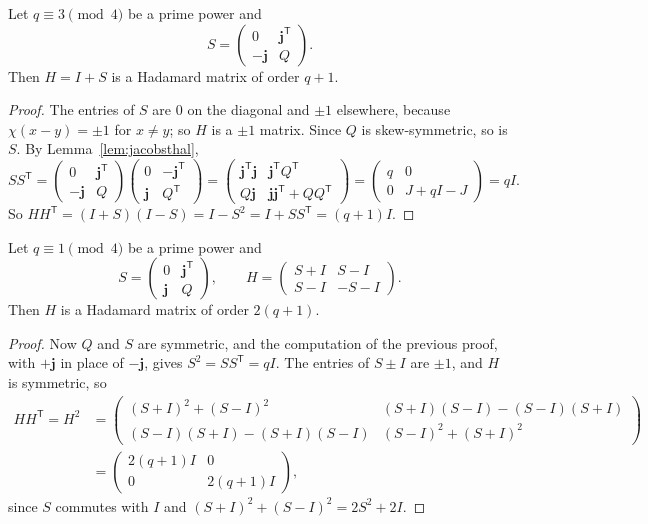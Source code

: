 \begin{theorem}[Paley I, 1933]\label{thm:paley1}
Let $q\equiv3\pmod4$ be a prime power and
\[
S=\begin{pmatrix}0&\mathbf j^{\mathsf T}\\-\mathbf j&Q\end{pmatrix}.
\]
Then $H=I+S$ is a Hadamard matrix of order $q+1$.
\end{theorem}
\begin{proof}
The entries of $S$ are $0$ on the diagonal and $\pm1$ elsewhere, because $\chi(x-y)=\pm1$ for $x\neq y$; so $H$ is a $\pm1$ matrix. Since $Q$ is
skew-symmetric, so is $S$. By Lemma~\ref{lem:jacobsthal},
\[
SS^{\mathsf T}=\begin{pmatrix}0&\mathbf j^{\mathsf T}\\-\mathbf j&Q\end{pmatrix}\begin{pmatrix}0&-\mathbf j^{\mathsf T}\\\mathbf j&Q^{\mathsf T}\end{pmatrix}
=\begin{pmatrix}\mathbf j^{\mathsf T}\mathbf j&\mathbf j^{\mathsf T}Q^{\mathsf T}\\Q\mathbf j&\mathbf j\mathbf j^{\mathsf T}+QQ^{\mathsf T}\end{pmatrix}
=\begin{pmatrix}q&0\\0&J+qI-J\end{pmatrix}=qI.
\]
So $HH^{\mathsf T}=(I+S)(I-S)=I-S^2=I+SS^{\mathsf T}=(q+1)I$.
\end{proof}

\begin{theorem}[Paley II, 1933]\label{thm:paley2}
Let $q\equiv1\pmod4$ be a prime power and
\[
S=\begin{pmatrix}0&\mathbf j^{\mathsf T}\\\mathbf j&Q\end{pmatrix},\qquad H=\begin{pmatrix}S+I&S-I\\S-I&-S-I\end{pmatrix}.
\]
Then $H$ is a Hadamard matrix of order $2(q+1)$.
\end{theorem}
\begin{proof}
Now $Q$ and $S$ are symmetric, and the computation of the previous proof, with $+\mathbf j$ in place of $-\mathbf j$, gives $S^2=SS^{\mathsf T}=qI$. The
entries of $S\pm I$ are $\pm1$, and $H$ is symmetric, so
\[
\begin{aligned}HH^{\mathsf T}=H^2&=\begin{pmatrix}(S+I)^2+(S-I)^2&(S+I)(S-I)-(S-I)(S+I)\\(S-I)(S+I)-(S+I)(S-I)&(S-I)^2+(S+I)^2\end{pmatrix}\\
&=\begin{pmatrix}2(q+1)I&0\\0&2(q+1)I\end{pmatrix},\end{aligned}
\]
since $S$ commutes with $I$ and $(S+I)^2+(S-I)^2=2S^2+2I$.
\end{proof}

